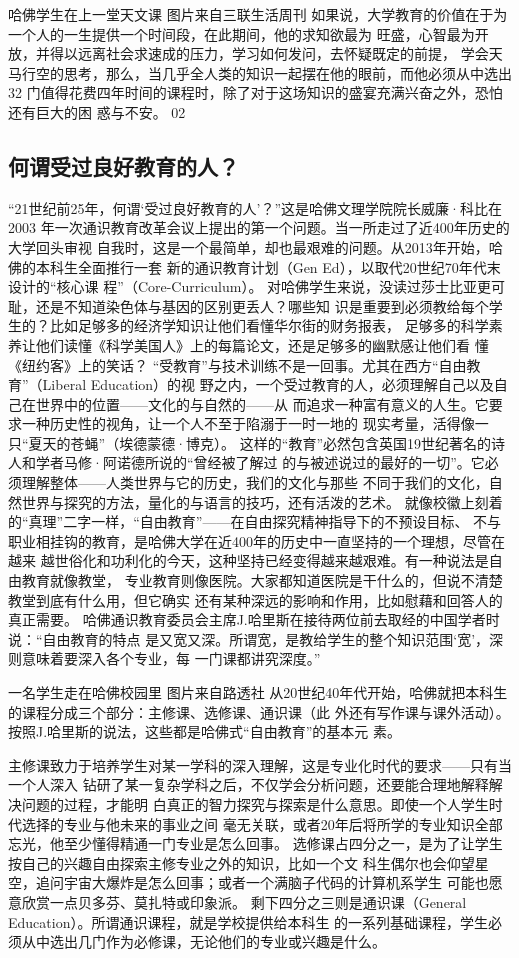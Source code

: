 \documentclass[11pt]{ctexart}
\begin{document}
{{{{哈佛学生在上一堂天文课
图片来自三联生活周刊
如果说，大学教育的价值在于为一个人的一生提供一个时间段，在此期间，他的求知欲最为
旺盛，心智最为开放，并得以远离社会求速成的压力，学习如何发问，去怀疑既定的前提，
学会天马行空的思考，那么，当几乎全人类的知识一起摆在他的眼前，而他必须从中选出32
门值得花费四年时间的课程时，除了对于这场知识的盛宴充满兴奋之外，恐怕还有巨大的困
惑与不安。
02
\subsection{何谓受过良好教育的人？}
\label{sec:org2990f01}
“21世纪前25年，何谓‘受过良好教育的人’？”这是哈佛文理学院院长威廉·科比在2003
年一次通识教育改革会议上提出的第一个问题。当一所走过了近400年历史的大学回头审视
自我时，这是一个最简单，却也最艰难的问题。从2013年开始，哈佛的本科生全面推行一套
新的通识教育计划（Gen Ed），以取代20世纪70年代末设计的“核心课
程”（Core-Curriculum）。
对哈佛学生来说，没读过莎士比亚更可耻，还是不知道染色体与基因的区别更丢人？哪些知
识是重要到必须教给每个学生的？比如足够多的经济学知识让他们看懂华尔街的财务报表，
足够多的科学素养让他们读懂《科学美国人》上的每篇论文，还是足够多的幽默感让他们看
懂《纽约客》上的笑话？
“受教育”与技术训练不是一回事。尤其在西方“自由教育”（Liberal Education）的视
野之内，一个受过教育的人，必须理解自己以及自己在世界中的位置——文化的与自然的——从
而追求一种富有意义的人生。它要求一种历史性的视角，让一个人不至于陷溺于一时一地的
现实考量，活得像一只“夏天的苍蝇”（埃德蒙德·博克）。
这样的“教育”必然包含英国19世纪著名的诗人和学者马修·阿诺德所说的“曾经被了解过
的与被述说过的最好的一切”。它必须理解整体——人类世界与它的历史，我们的文化与那些
不同于我们的文化，自然世界与探究的方法，量化的与语言的技巧，还有活泼的艺术。
就像校徽上刻着的“真理”二字一样，“自由教育”——在自由探究精神指导下的不预设目标、
不与职业相挂钩的教育，是哈佛大学在近400年的历史中一直坚持的一个理想，尽管在越来
越世俗化和功利化的今天，这种坚持已经变得越来越艰难。有一种说法是自由教育就像教堂，
专业教育则像医院。大家都知道医院是干什么的，但说不清楚教堂到底有什么用，但它确实
还有某种深远的影响和作用，比如慰藉和回答人的真正需要。
哈佛通识教育委员会主席J.哈里斯在接待两位前去取经的中国学者时说：“自由教育的特点
是又宽又深。所谓宽，是教给学生的整个知识范围‘宽’，深则意味着要深入各个专业，每
一门课都讲究深度。”

一名学生走在哈佛校园里
图片来自路透社
从20世纪40年代开始，哈佛就把本科生的课程分成三个部分：主修课、选修课、通识课（此
外还有写作课与课外活动）。按照J.哈里斯的说法，这些都是哈佛式“自由教育”的基本元
素。

主修课致力于培养学生对某一学科的深入理解，这是专业化时代的要求——只有当一个人深入
钻研了某一复杂学科之后，不仅学会分析问题，还要能合理地解释解决问题的过程，才能明
白真正的智力探究与探索是什么意思。即使一个人学生时代选择的专业与他未来的事业之间
毫无关联，或者20年后将所学的专业知识全部忘光，他至少懂得精通一门专业是怎么回事。
选修课占四分之一，是为了让学生按自己的兴趣自由探索主修专业之外的知识，比如一个文
科生偶尔也会仰望星空，追问宇宙大爆炸是怎么回事；或者一个满脑子代码的计算机系学生
可能也愿意欣赏一点贝多芬、莫扎特或印象派。
剩下四分之三则是通识课（General Education）。所谓通识课程，就是学校提供给本科生
的一系列基础课程，学生必须从中选出几门作为必修课，无论他们的专业或兴趣是什么。

}}}}
\end{document}
